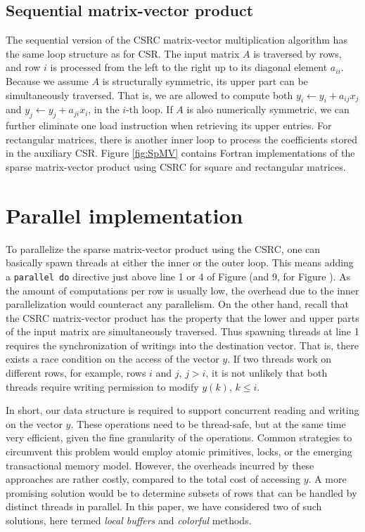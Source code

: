 \documentclass[11pt]{article}
\begin{document}
\subsection{Sequential matrix-vector product}

The sequential version of the CSRC matrix-vector multiplication algorithm has
the same loop structure as for CSR.  The input matrix $A$ is
traversed by rows, and row $i$ is processed from the left to the right up to
its diagonal element $a_{ii}$.  Because we assume $A$ is structurally
symmetric, its upper part can be simultaneously traversed.  That is, we are
allowed to compute both $y_i \leftarrow y_i + a_{ij} x_j$ and $y_j \leftarrow
y_j + a_{ji} x_i$, in the $i$-th loop.  If $A$ is also numerically symmetric, we can further
eliminate one load instruction when retrieving its upper entries.  For
rectangular matrices, there is another inner loop to process the coefficients
stored in the auxiliary CSR.  Figure \ref{fig:SpMV} contains Fortran implementations of
the sparse matrix-vector product using CSRC for square and rectangular matrices.

\section{Parallel implementation}
\label{sec:parallel-csrc}

To parallelize the sparse matrix-vector product using the CSRC, one can basically spawn threads at either the inner or the outer loop.
This means adding a \texttt{parallel do} directive just above line 1 or 4 of Figure  (and 9, for Figure ).
As the amount of computations per row is usually low, the overhead due to the inner parallelization would counteract any parallelism.
On the other hand, recall that the CSRC matrix-vector product has the property that
the lower and upper parts of the input matrix are simultaneously traversed.
Thus spawning threads at line 1 requires the synchronization of writings into the destination vector.
That is, there exists a race condition on the access of the vector $y$.
If two threads work on different rows,
for example, rows $i$ and $j$, $j > i$, it is not unlikely that both threads
require writing permission to modify $y(k)$, $k \leq i$.

In short, our data structure is required to support concurrent reading and
writing on the vector $y$.  These operations need to be thread-safe, but at
the same time very efficient, given the fine granularity of the operations.
Common strategies to circumvent this problem would employ atomic primitives,
locks, or the emerging transactional memory model.  However, the overheads incurred by
these approaches are rather costly, compared to the total cost of accessing
$y$.  A more promising solution would be to determine subsets of rows
that can be handled by distinct threads in parallel.  In this paper, we have
considered two of such solutions, here termed \textit{local buffers} and
\textit{colorful} methods.
\end{document}
